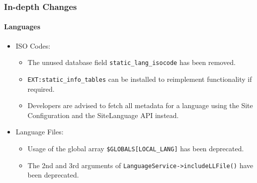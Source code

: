 \begin{frame}[fragile]
	\frametitle{In-depth Changes}
	\framesubtitle{Languages}

	\begin{itemize}
		\item ISO Codes:

			\begin{itemize}
				\item The unused database field \texttt{static\_lang\_isocode} has been removed.
				\item \texttt{EXT:static\_info\_tables} can be installed to reimplement functionality if required.
				\item Developers are advised to fetch all metadata for a language using the Site Configuration and the SiteLanguage API instead.
			\end{itemize}

		\item Language Files:

			\begin{itemize}
				\item Usage of the global array \texttt{\$GLOBALS[LOCAL\_LANG]} has been deprecated.
				\item The 2nd and 3rd arguments of \texttt{LanguageService->includeLLFile()} have been deprecated.
			\end{itemize}

	\end{itemize}

\end{frame}


